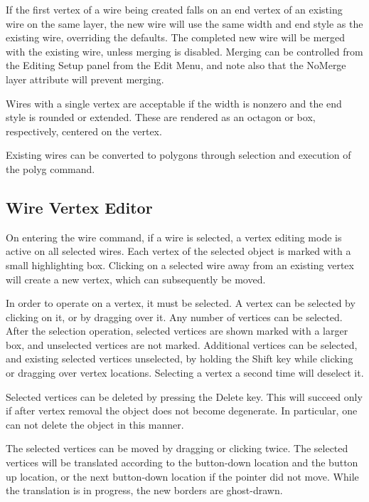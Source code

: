 If the first vertex of a wire being created falls on an end vertex of
an existing wire on the same layer, the new wire will use the same
width and end style as the existing wire, overriding the defaults. 
The completed new wire will be merged with the existing wire, unless
merging is disabled.  Merging can be controlled from the {\cb Editing
Setup} panel from the {\cb Edit Menu}, and note also that the {\et
NoMerge} layer attribute will prevent merging.

Wires with a single vertex are acceptable if the width is nonzero and
the end style is rounded or extended.  These are rendered as an
octagon or box, respectively, centered on the vertex.

Existing wires can be converted to polygons through selection and
execution of the {\cb polyg} command.

\subsection{Wire Vertex Editor}

On entering the {\cb wire} command, if a wire is selected, a vertex
editing mode is active on all selected wires.  Each vertex of the
selected object is marked with a small highlighting box.  Clicking on
a selected wire away from an existing vertex will create a new vertex,
which can subsequently be moved.

In order to operate on a vertex, it must be selected.  A vertex can be
selected by clicking on it, or by dragging over it.  Any number of
vertices can be selected.  After the selection operation, selected
vertices are shown marked with a larger box, and unselected vertices
are not marked.  Additional vertices can be selected, and existing
selected vertices unselected, by holding the {\kb Shift} key while
clicking or dragging over vertex locations.  Selecting a vertex a
second time will deselect it.

Selected vertices can be deleted by pressing the {\kb Delete} key. 
This will succeed only if after vertex removal the object does not
become degenerate.  In particular, one can not delete the object in
this manner.

The selected vertices can be moved by dragging or clicking twice.  The
selected vertices will be translated according to the button-down
location and the button up location, or the next button-down location
if the pointer did not move.  While the translation is in progress,
the new borders are ghost-drawn.

